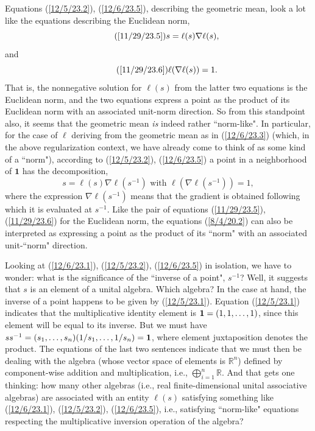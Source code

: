 \documentclass{amsart}
\numberwithin{equation}{section}
\theoremstyle{definition}
\numberwithin{theorem}{section}
\begin{document}
{ 
 Equations (\ref{12/5/23.2}), (\ref{12/6/23.5}), describing the geometric mean, look a lot like the equations describing the Euclidean norm,  \enlargethispage{1cm}\begin{equation}\tag{\ref{11/29/23.5}}  s = \ell(s)\nabla\ell(s),\end{equation} and \begin{equation}\tag{\ref{11/29/23.6}} \ell(\nabla\ell(s)) = 1.\end{equation}  That is, the nonnegative solution for $\ell(s)$ from the latter two equations is the Euclidean norm, and the two equations express a point as the product of its Euclidean norm with an associated unit-norm direction.
So from this standpoint also, it seems that the geometric mean {\it is} indeed rather ``norm-like".  In particular, for the case of $\ell$ deriving from the geometric mean as in (\ref{12/6/23.3}) (which, in the above regularization context, we have already come to think of as some kind of a ``norm"), according to (\ref{12/5/23.2}), (\ref{12/6/23.5}) a point in a neighborhood of $\mathbf{1}$ has the decomposition,
\begin{equation}\label{8/4/20.2} s = \ell(s)\nabla \ell(s^{-1}) \mbox{  with   }  \ell(\nabla \ell(s^{-1})) = 1,\end{equation} where the expression $\nabla \ell(s^{-1})$ means that the gradient is obtained following which it is evaluated at $s^{-1}$.  Like the pair of equations (\ref{11/29/23.5}), (\ref{11/29/23.6}) for the Euclidean norm, the equations (\ref{8/4/20.2}) can also be interpreted as expressing a point as the product of its ``norm" with an associated unit-``norm"  direction.


Looking at (\ref{12/6/23.1}), (\ref{12/5/23.2}),  (\ref{12/6/23.5}) in isolation, we have to wonder: what is the significance of the ``inverse of a point", $s^{-1}$?  Well, it suggests that $s$ is an element of a unital algebra.  Which algebra?  In the case at hand, the inverse of a point happens to be given by (\ref{12/5/23.1}).   Equation (\ref{12/5/23.1}) indicates that the multiplicative identity element is ${\bf 1}= (1,1,\dots, 1)$, since this element will be equal to its inverse.  But we must have  $ss^{-1} = (s_1,\dots,s_n)(1/s_1,\dots,1/s_n) = {\bf 1}$, where element juxtaposition denotes the product. The equations of the last two sentences indicate that we must then be dealing with the algebra (whose vector space of elements is $\mathbb{R}^n$) defined by component-wise addition and multiplication, i.e., $\bigoplus_{i=1}^n \mathbb{R}$.  And that gets one thinking: how many other algebras (i.e., real finite-dimensional unital associative algebras) are associated with an entity $\ell(s)$ satisfying something like (\ref{12/6/23.1}), (\ref{12/5/23.2}),  (\ref{12/6/23.5}), i.e., satisfying ``norm-like" equations respecting the multiplicative inversion operation of the algebra?
 

}
\end{document}
